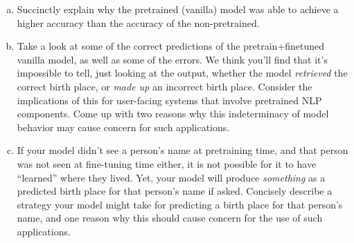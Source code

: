 \begin{enumerate}[(a)]

\item {}
Succinctly explain why the pretrained (vanilla) model was able to achieve a higher accuracy than the accuracy of the non-pretrained.

\begin{answer}
\end{answer}

\item {}
Take a look at some of the correct predictions of the pretrain+finetuned vanilla model, as well as some of the errors.
We think you'll find that it's impossible to tell, just looking at the output, whether the model \textit{retrieved} the correct birth place, or \textit{made up} an incorrect birth place.
Consider the implications of this for user-facing systems that involve pretrained NLP components.
Come up with two reasons why this indeterminacy of model behavior may cause concern for such applications.

\begin{answer}
\end{answer}

\item {}
If your model didn't see a person's name at pretraining time, and that person was not seen at fine-tuning time either, it is not possible for it to have ``learned'' where they lived.
Yet, your model will produce \textit{something} as a predicted birth place for that person's name if asked.
Concisely describe a strategy your model might take for predicting a birth place for that person's name, and one reason why this should cause concern for the use of such applications.
\end{enumerate}

\begin{answer}
\end{answer}



 
